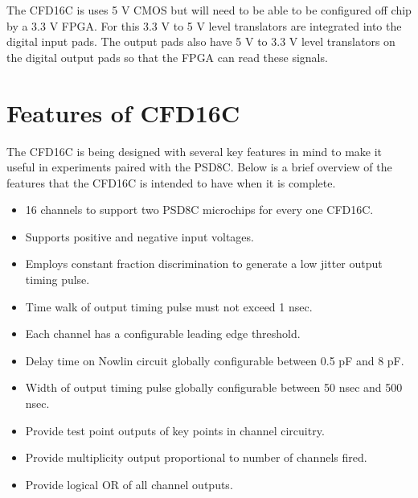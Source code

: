 \documentclass[12pt,oneside,final]{siuethesis}
\theoremstyle{definition}
\begin{document}
\par The CFD16C is uses 5 V CMOS but will need to be able to be configured off chip by a 3.3 V FPGA. For this 3.3 V to 5 V level translators are integrated into the digital input pads. The output pads also have 5 V to 3.3 V level translators on the digital output pads so that the FPGA can read these signals.

\section{Features of CFD16C}
\par The CFD16C is being designed with several key features in mind to make it useful in experiments paired with the PSD8C. Below is a brief overview of the features that the CFD16C is intended to have when it is complete.

\begin{itemize}
\item
16 channels to support two PSD8C microchips for every one CFD16C.
\item
Supports positive and negative input voltages.
\item
Employs constant fraction discrimination to generate a low jitter output timing pulse.
\item
Time walk of output timing pulse must not exceed 1 nsec.
\item
Each channel has a configurable leading edge threshold.
\item
Delay time on Nowlin circuit globally configurable between 0.5 pF and 8 pF.
\item
Width of output timing pulse globally configurable between 50 nsec and 500 nsec.
\item
Provide test point outputs of key points in channel circuitry.
\item
Provide multiplicity output proportional to number of channels fired.
\item
Provide logical OR of all channel outputs.
\end{itemize}
\end{document}
